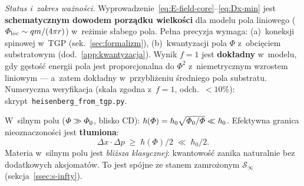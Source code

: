 \begin{proposition}
\medskip\noindent\emph{Status i~zakres wa\.zno\'sci.}
Wyprowadzenie~\eqref{eq:E-field-core}--\eqref{eq:Dx-min} jest
\textbf{schematycznym dowodem porz\k{a}dku wielko\'sci}
dla modelu pola liniowego ($\Phi_{\rm loc} \sim qm/(4\pi r)$)
w~re\.zimie s\l{}abego pola. Pe\l{}na precyzja wymaga:
(a)~koneksji spinowej w~TGP (sek.~\ref{sec:formalizm}),
(b)~kwantyzacji pola $\Phi$ z~obci\k{e}ciem substratowym
(dod.~\ref{app:kwantyzacja}).
Wynik $f = 1$ jest \textbf{dok\l{}adny} w~modelu,
gdy g\k{e}sto\'s\'c energii pola jest proporcjonalna do $\Phi^2$
z~niemetrycznym wzrostem liniowym ---
a~zatem dok\l{}adny w~przybli\.zeniu \'sredniego pola substratu.
Numeryczna weryfikacja (skala zgodna z~$f=1$, odch.~$<10\%$):
skrypt~\texttt{heisenberg\_from\_tgp.py}.
\end{proposition}

\begin{corollary}%
\label{cor:uncertainty-variable}
W~silnym polu ($\Phi \gg \PhiZero$, blisko CD):
$\hbar(\Phi) = \hbar_0\sqrt{\PhiZero/\Phi} \ll \hbar_0$.
Efektywna granica nieoznaczono\'sci jest \textbf{t\l{}umiona}:
\[
  \Delta x \cdot \Delta p \;\geq\; \hbar(\Phi)/2 \;\ll\; \hbar_0/2.
\]
Materia w~silnym polu jest \emph{bli\.zsza klasycznej}:
kwantowo\'s\'c zanika naturalnie bez dodatkowych aksjomat\'ow.
To jest sp\'ojne ze stanem zamro\.zonym $\mathcal{S}_\infty$
(sekcja~\ref{ssec:s-infty}).
\end{corollary}

